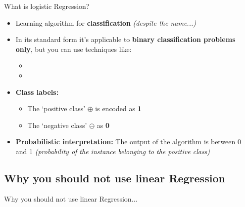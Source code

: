 \begin{frame}{What is logistic Regression?}{}
	\begin{itemize}
		\item Learning algorithm for \textbf{classification} {\footnotesize \textit{(despite the name...)}}
		\item In its standard form it's applicable to \textbf{binary classification problems only}, but you can use techniques like:
		\begin{itemize}
			\item {}
			\item {}
		\end{itemize}
		\item \textbf{Class labels:}
		\begin{itemize}
			\item The `positive class' $\oplus$ is encoded as \textbf{1}
			\item The `negative class' $\ominus$ as \textbf{0}
		\end{itemize}
		\item \textbf{Probabilistic interpretation:} The output of the algorithm is between 0 and 1
			{\footnotesize \textit{(probability of the instance belonging to the positive class)}}
	\end{itemize}
\end{frame}


\subsection{Why you should not use linear Regression}

\begin{frame}{Why you should not use linear Regression...}{}\important
	
\end{frame}


